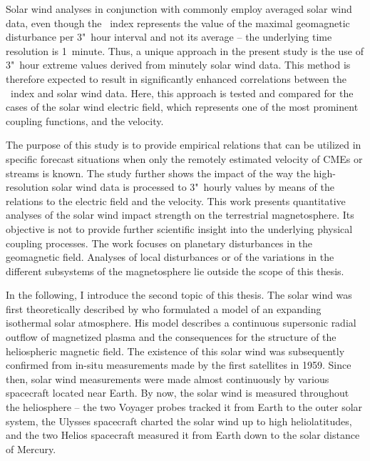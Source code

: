 Solar wind analyses in conjunction with \Kp{} commonly employ averaged solar wind data, even though the \Kp~index represents the value of the maximal geomagnetic disturbance per 3"~hour interval and not its average -- the underlying time resolution is 1~minute. Thus, a unique approach in the present study is the use of 3"~hour extreme values derived from minutely solar wind data. This method is therefore expected to result in significantly enhanced correlations between the \Kp~index and solar wind data. Here, this approach is tested and compared for the cases of the solar wind electric field, which represents one of the most prominent coupling functions, and the velocity.

The purpose of this study is to provide empirical \Kp{} relations that can be utilized in specific forecast situations when only the remotely estimated velocity of CMEs or streams is known.
The study further shows the impact of the way the high-resolution solar wind data is processed to 3"~hourly values by means of the \Kp{} relations to the electric field and the velocity.
This work presents quantitative analyses of the solar wind impact strength on the terrestrial magnetosphere. Its objective is not to provide further scientific insight into the underlying physical coupling processes.
The work focuses on planetary disturbances in the geomagnetic field. Analyses of local disturbances or of the variations in the different subsystems of the magnetosphere lie outside the scope of this thesis.

\bigskip

In the following, I introduce the second topic of this thesis.
The solar wind was first theoretically described by \citet{Parker1958} who formulated a model of an expanding isothermal solar atmosphere. His model describes a continuous supersonic radial outflow of magnetized plasma and the consequences for the structure of the heliospheric magnetic field. The existence of this solar wind was subsequently confirmed from in-situ measurements made by the first satellites in 1959. Since then, solar wind measurements were made almost continuously by various spacecraft located near Earth. By now, the solar wind is measured throughout the heliosphere -- the two Voyager probes tracked it from Earth to the outer solar system, the Ulysses spacecraft charted the solar wind up to high heliolatitudes, and the two Helios spacecraft measured it from Earth down to the solar distance of Mercury.

